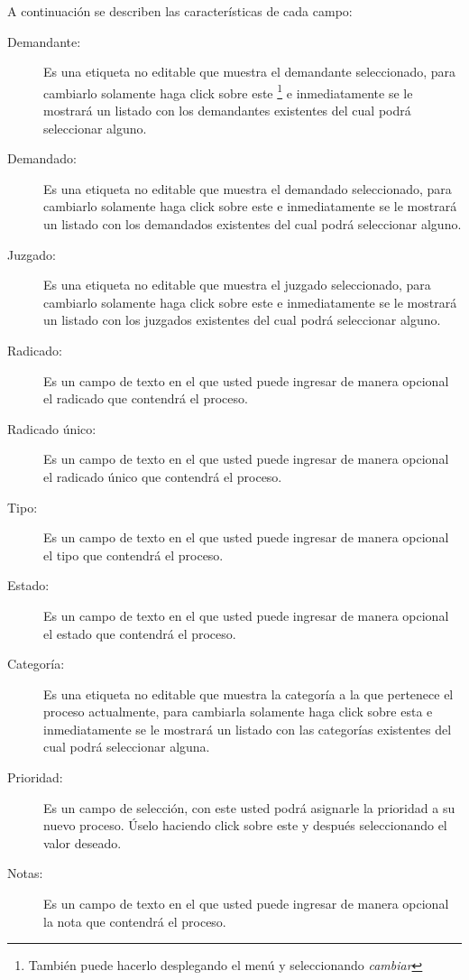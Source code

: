 A continuaci\'on se describen las
caracter\'isticas de cada campo:
\begin{description}
\item[Demandante:]Es una etiqueta no editable que muestra el demandante
seleccionado, para cambiarlo solamente haga click sobre este
\footnote{Tambi\'en puede hacerlo desplegando el men\'u \blackberry y
seleccionando \emph{cambiar}}
e inmediatamente se
le mostrar\'a un listado con los demandantes existentes del cual podr\'a
seleccionar alguno.
\item[Demandado:]Es una etiqueta no editable que muestra el demandado
seleccionado, para cambiarlo solamente haga click sobre este
\footnotemark[\value{footnote}]
e inmediatamente
se le mostrar\'a un listado con los demandados existentes del cual podr\'a
seleccionar alguno.
\item[Juzgado:]Es una etiqueta no editable que muestra el juzgado
seleccionado, para cambiarlo solamente haga click sobre este
\footnotemark[\value{footnote}]
e inmediatamente
se le mostrar\'a un listado con los juzgados existentes del cual podr\'a
seleccionar alguno.
\item[Radicado:]Es un campo de texto en el que usted puede ingresar de manera
opcional el radicado que contendr\'a el proceso.
\item[Radicado \'unico:]Es un campo de texto en el que usted puede ingresar de
manera opcional el radicado \'unico que contendr\'a el proceso.
\item[Tipo:]Es un campo de texto en el que usted puede ingresar de manera
opcional el tipo que contendr\'a el proceso.
\item[Estado:]Es un campo de texto en el que usted puede ingresar de manera
opcional el estado que contendr\'a el proceso.
\item[Categor\'ia:]Es una etiqueta no editable que muestra la categor\'ia
a la que pertenece el proceso actualmente, para cambiarla solamente haga click
sobre esta
\footnotemark[\value{footnote}]
e inmediatamente
se le mostrar\'a un listado con las categor\'ias existentes del cual podr\'a
seleccionar alguna.
\item[Prioridad:]Es un campo de selecci\'on, con este usted podr\'a asignarle
la prioridad a su nuevo proceso. \'Uselo haciendo click sobre este y
despu\'es seleccionando el valor deseado.
\item[Notas:]Es un campo de texto en el que usted puede ingresar de manera
opcional la nota que contendr\'a el proceso.
\end{description}

